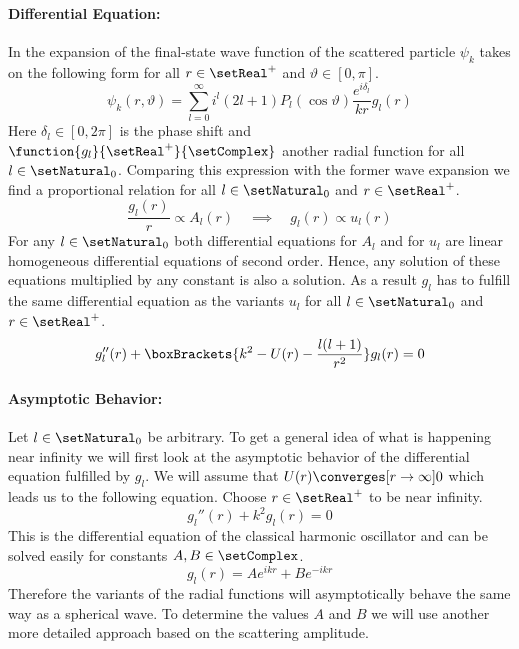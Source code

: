 \documentclass[10pt,fleqn]{article}
\begin{document}
\begin{multicols}{2}
      \paragraph{Differential Equation:}
      In the expansion of the final-state wave function of the scattered particle $ψ_k$ takes on the following form for all $r\in\setReal^+$ and $ϑ\in[0,π]$.
      \[
        ψ_k(r,ϑ) = \sum_{l=0}^\infty i^l (2l+1) P_l(\cos ϑ) \frac{e^{iδ_l}}{kr}g_l(r)
      \]
      Here $δ_l\in[0,2π]$ is the phase shift and $\function{g_l}{\setReal^+}{\setComplex}$ another radial function for all $l\in\setNatural_0$.
      Comparing this expression with the former wave expansion we find a proportional relation for all $l\in\setNatural_0$ and $r\in\setReal^+$.
      \[
        \frac{g_l(r)}{r} \propto A_l(r)
        \quad\implies\quad
        g_l(r) \propto u_l(r)
      \]
      For any $l\in\setNatural_0$ both differential equations for $A_l$ and for $u_l$ are linear homogeneous differential equations of second order.
      Hence, any solution of these equations multiplied by any constant is also a solution.
      As a result $g_l$ has to fulfill the same differential equation as the variants $u_l$ for all $l\in\setNatural_0$ and $r\in\setReal^+$.
      \[
        g_l''(r) + \boxBrackets{k^2-U(r)-\frac{l(l+1)}{r^2}}g_l(r) = 0
      \]

      \paragraph{Asymptotic Behavior:}
      Let $l\in\setNatural_0$ be arbitrary.
      To get a general idea of what is happening near infinity we will first look at the asymptotic behavior of the differential equation fulfilled by $g_l$.
      We will assume that $U(r)\converges[r\to\infty] 0$ which leads us to the following equation.
      Choose $r\in\setReal^+$ to be near infinity.
      \[
        g_l''(r) + k^2 g_l(r) = 0
      \]
      This is the differential equation of the classical harmonic oscillator and can be solved easily for constants $A,B\in\setComplex$.
      \[
        g_l(r) = A e^{ikr} + B e^{-ikr}
      \]
      Therefore the variants of the radial functions will asymptotically behave the same way as a spherical wave.
      To determine the values $A$ and $B$ we will use another more detailed approach based on the scattering amplitude.


\end{multicols}
\end{document}
